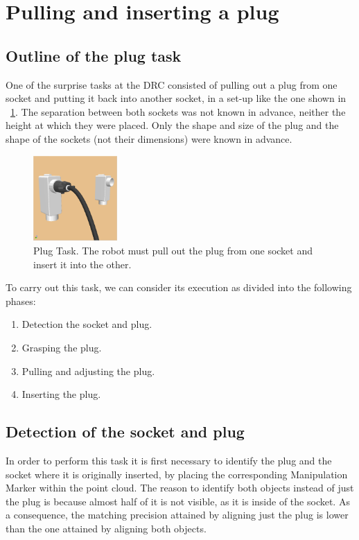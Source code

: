 \section{Pulling and inserting a plug}
	\label{sec:plug}
	
	\subsection{Outline of the plug task}
	
		One of the surprise tasks at the DRC consisted of pulling out a plug
		from one socket and putting it back into another socket, in a set-up like the one shown in
		\figurename~\ref{fig:Sockets-Plug}.
		The separation between both sockets was not known in advance, neither the height at which
		they were placed.
		Only the shape and size of the plug and the shape of the sockets (not their dimensions)
		were known in advance.
		
		\begin{figure}[t]
			\centering
			\includegraphics[height = 3.25cm]{img/Sockets-Plug}
			\caption{Plug Task. The robot must pull out the plug from one socket and insert it into the other.}
			\label{fig:Sockets-Plug}
		\end{figure}
		
		To carry out this task, we can consider its execution as divided into the following phases:
		\begin{enumerate}
			\item Detection the socket and plug.
			\item Grasping the plug.
			\item Pulling and adjusting the plug.
			\item Inserting the plug.
		\end{enumerate}
	
	\subsection{Detection of the socket and plug}
		
		In order to perform this task it is first necessary to identify the plug and the socket where
		it is originally inserted, by placing the corresponding Manipulation Marker within the point cloud.
		The reason to identify both objects instead of just the plug is because almost half of it
		is not visible, as it is inside of the socket.
		As a consequence, the matching precision attained by aligning just the plug is lower than the one
		attained by aligning both objects.
		
